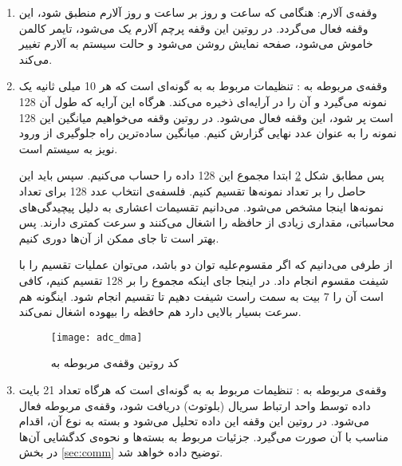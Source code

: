 \begin{enumerate}
\begin{enumerate}
		\item تایمر صفحه نمایش:
		هرگاه وقفه‌ی این تایمر فعال شود به این معنی است که چهار ثانیه از آخرین تعامل کاربر با ساعت گذشته است و باید صفحه نمایش خاموش شود. شکل \ref{fig:screen-timer} کد این قسمت را نشان می‌دهد.
		\begin{figure}[h]
			\centering
			\texttt{[image: screen\_timer]}
			\caption{کد روتین وقفه‌ی تایمر صفحه نمایش}
			\label{fig:screen-timer}
		\end{figure}
		
		\item تایمر اصلی سیستم:
این تایمر هر 250 میلی ثانیه سرریز می‌شود. در نتیجه هر 250 میلی ثانیه روتین وقفه اجرا می‌شود. در روتین وقفه‌ی این تایمر ابتدا بررسی می‌شود که آیا صفحه نمایش باید روشن شود یا خیر. اگر نیاز به روشن شدن بود، با توجه به حالت سیستم و ماشین حالتی که در بخش \ref{sec:fsm} توضیح داده شد، روتین حالت مربوطه را اجرا می‌کند.
	\end{enumerate}
	\item وقفه‌ی آلارم:
	هنگامی که ساعت و روز بر ساعت و روز آلارم منطبق شود، این وقفه فعال می‌گردد. در روتین این وقفه پرچم آلارم یک می‌شود، تایمر کالمن خاموش می‌شود، صفحه نمایش روشن می‌شود و حالت سیستم به آلارم تغییر می‌کند.
	\item وقفه‌ی  مربوطه به :
	تنظیمات  مربوط به  به گونه‌ای است که  هر 10 میلی ثانیه یک نمونه می‌گیرد و آن را در آرایه‌ای ذخیره می‌کند. هرگاه این آرایه که طول آن 128 است پر شود، این وقفه فعال می‌شود. در روتین وقفه می‌خواهیم میانگین این 128 نمونه را به عنوان عدد نهایی گزارش کنیم. میانگین ساده‌ترین راه جلوگیری از ورود نویز به سیستم است.
	
	پس مطابق شکل \ref{fig:adc-dma} ابتدا مجموع این 128 داده را حساب می‌کنیم. سپس باید این حاصل را بر تعداد نمونه‌ها تقسیم کنیم. فلسفه‌ی انتخاب عدد 128 برای تعداد نمونه‌ها اینجا مشخص می‌شود. می‌دانیم تقسیمات اعشاری به دلیل پیچیدگی‌های محاسباتی، مقداری زیادی از حافظه را اشغال می‌کنند و سرعت کمتری دارند. پس بهتر است تا جای ممکن از آن‌ها دوری کنیم.
	
	از طرفی می‌دانیم که اگر مقسوم‌علیه توان دو باشد، می‌توان عملیات تقسیم را با شیفت مقسوم انجام داد. در اینجا جای اینکه مجموع را بر 128 تقسیم کنیم، کافی است آن را 7 بیت به سمت راست شیفت دهیم تا تقسیم انجام شود. اینگونه هم سرعت بسیار بالایی دارد هم حافظه را بیهوده اشغال نمی‌کند.
	\begin{figure}[h]
		\centering
		\texttt{[image: adc\_dma]}
		\caption{کد روتین وقفه‌ی  مربوطه به }
		\label{fig:adc-dma}
	\end{figure}
	\item وقفه‌ی  مربوطه به :
	تنظیمات  مربوط به  به گونه‌ای است که هرگاه تعداد 21 بایت داده توسط واحد ارتباط سریال (بلوتوث) دریافت شود، وقفه‌ی مربوطه فعال می‌‌شود. در روتین این وقفه این داده تحلیل می‌شود و بسته به نوع آن، اقدام مناسب با آن صورت می‌گیرد. جزئیات مربوط به بسته‌ها و نحوه‌ی کدگشایی آن‌ها در بخش \ref{sec:comm} توضیح داده خواهد شد.
\end{enumerate}
